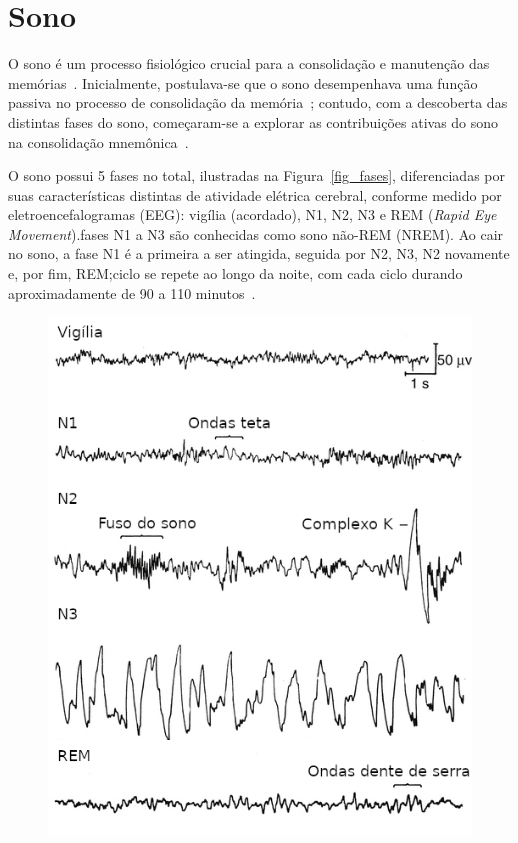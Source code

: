 \section{Sono}

O sono é um processo fisiológico crucial para a consolidação e manutenção das memórias~\cite{blissittSleep2001, walkerSleep2006,
diekelmannMemory2010}. Inicialmente, postulava-se que o sono desempenhava uma função passiva no processo de consolidação da
memória~\cite{jenkinsObliviscence1924}; contudo, com a descoberta das distintas fases do sono, começaram-se a explorar as
contribuições ativas do sono na consolidação mnemônica~\cite{aserinskyRegularly1953}.

O sono possui 5 fases no total, ilustradas na Figura~\ref{fig_fases}, diferenciadas por suas características distintas de
atividade elétrica cerebral, conforme medido por eletroencefalogramas (EEG)\cite{silberVisual2007}: vigília (acordado), N1, N2, N3
e REM (\textit{Rapid Eye Movement}).\@As fases N1 a N3 são conhecidas como sono não-REM (NREM). Ao cair no sono, a fase N1 é a
primeira a ser atingida, seguida por N2, N3, N2 novamente e, por fim, REM;\@esse ciclo se repete ao longo da noite, com cada ciclo
durando aproximadamente de 90 a 110 minutos~\cite{k.patelPhysiology2022}.

\begin{figure}[!ht]
\centering
\includegraphics[width=12cm]{figuras/fases_sono.png}
\end{figure}

